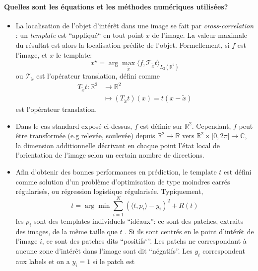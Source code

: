 \documentclass{article}
\begin{document}
\paragraph{Quelles sont les équations et les méthodes numériques utilisées?} 
\begin{itemize}
    \setlength{\itemsep}{0pt}
    \item La localisation de l'objet d'intérêt dans une image se fait par
      \emph{cross-correlation} \cite{cross-correlation}: un
        \emph{template} est ``appliqué`` en tout point $ x $ de l'image.  La valeur
        maximale du résultat est alors la localisation prédite de l'objet. Formellement,
        si $ f $ est l'image, et $ x $ le template:
      \[
      {x}^{\star} = \arg \max_{ \tilde{ x } } \langle  f, \mathcal  T_{ \tilde{ x }}
      t\rangle_{L_2(\mathbb{R}^2)}
      \] 
      ou $ \mathcal  T_{ \tilde{ x }}$  est l'opérateur translation, défini comme
      \[
      \begin{aligned}
        T_{ \tilde{ x }}t:  \mathbb{R}^2 &\longrightarrow \mathbb{R}^2 \\
                                         &\longmapsto \left ( T_{ \tilde{ x }}t \right )(x) = t( x - \tilde{ x })
      \end{aligned}
      \] 
       est l'opérateur translation.
    \item Dans le cas standard exposé ci-dessus, $ f $ est définie sur $ \mathbb{R}^2 $. Cependant, $ f $
        peut être transformée (e.g relevée, soulevée) depuis $ \mathbb{R}^2  \to
        \mathbb{R} $  vers $ \mathbb{R}^2 \times \lbrack 0, 2 \pi \rbrack  \to \mathbb{
        C} $, la dimension
        additionnelle décrivant en chaque point l'état local de l'orientation de l'image
        selon un certain nombre de directions.
    \item Afin d'obtenir des bonnes performances en prédiction, le template $ t $ est
      défini comme solution d'un problème d'optimisation de type
        moindres carrés régularisés, ou régression logistique régularisée.
        Typiquement,
        \[
        t = \arg \min_{  } \sum\limits_{ i=1 }^{ N } \left ( \langle t, p_i \rangle
        - y_i \right )^2 + R(t) 
        \] 
        les $ p_i $ sont des templates individuels ``idéaux'': ce sont des patches,
        extraits des images, de la même taille que $ t $ . Si ils sont centrés en le point d'intérêt
        de l'image $ i $, ce sont des patches dits ``positifs`''. Les patchs ne correspondant à aucune zone d'intérêt 
        dans l'image sont dit ``négatifs''. Les $y_i$ correspondent aux labels et on a $y_i =1$ si le patch est 

\end{itemize}
\end{document}
